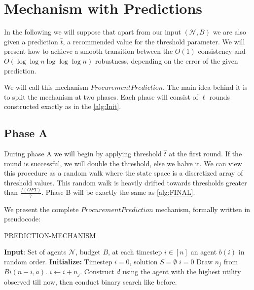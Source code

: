     \section{Mechanism with Predictions}
In the following we will suppose that apart from our input $(\mathcal{N},B)$ we are also given a prediction $\hat{t}$, a recommended value for the threshold parameter. We will present how to achieve a smooth transition between the $O(1)$ consistency and $O(\log\log n \log \log\log n)$ robustness, depending on the error of the given prediction. 

We will call this mechanism $ProcurementPrediction$. The main idea behind it is to split the mechanism at two phases. Each phase will consist of $\ell$ rounds constructed exactly as in the \ref{alg:Init}.
\subsection{Phase A}
During phase A we will begin by applying threshold $\hat{t}$ at the first round. If the round is successful, we will double the threshold, else we halve it. We can view this procedure as a random walk where the state space is a discretized array of threshold values. This random walk is heavily drifted towards thresholds greater than $\frac{f(OPT)}{7}$. Phase B will be exactly the same as \ref{alg:FINAL}.

We present the complete $ProcurementPrediction$ mechanism, formally written in pseudocode:

\begin{algorithm}[H]
\caption{PREDICTION-MECHANISM}\label{alg:PRED}
\begin{algorithmic}[1]
\STATE \textbf{Input}: Set of agents $\mathcal{N}$, budget $B$, at each timestep $i \in [n]$ an agent $b(i)$ in random order.
\STATE \textbf{Initialize:} Timestep $i=0$, solution $S =\emptyset$
\STATE
    \STATE $i=0$
    \STATE Draw $n_j$ from $Bi(n-i,a)$.
    \STATE $i \gets i+ n_j$.
    \ENDFOR
\STATE
    \ENDIF
    \ENDFOR
    \STATE Construct $d$ using the agent with the highest utility observed till now, then conduct binary search like before.
\end{algorithmic}
\end{algorithm}

